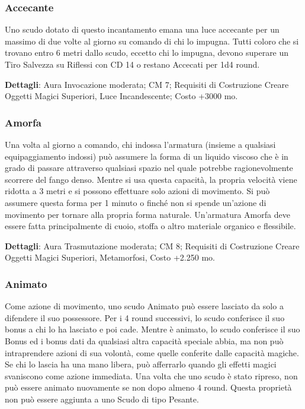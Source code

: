 \begin{multicols}{2}
\subsubsection{Accecante}

Uno scudo dotato di questo incantamento emana una luce accecante per un massimo di due volte al giorno su comando di chi lo impugna. Tutti coloro che si trovano entro 6 metri dallo scudo, eccetto chi lo impugna, devono superare un Tiro Salvezza su Riflessi con CD 14 o restano Accecati per 1d4 round.

\textbf{Dettagli}: Aura Invocazione moderata; CM 7; Requisiti di Costruzione Creare Oggetti Magici Superiori, Luce Incandescente; Costo +3000 mo.

\subsubsection{Amorfa}

Una volta al giorno a comando, chi indossa l'armatura (insieme a qualsiasi equipaggiamento indossi) può assumere la forma di un liquido viscoso che è in grado di passare attraverso qualsiasi spazio nel quale potrebbe ragionevolmente scorrere del fango denso. Mentre si usa questa capacità, la propria velocità viene ridotta a 3 metri e si possono effettuare solo azioni di movimento. Si può assumere questa forma per 1 minuto o finché non si spende un'azione di movimento per tornare alla propria forma naturale. Un'armatura Amorfa deve essere fatta principalmente di cuoio, stoffa o altro materiale organico e flessibile.

\textbf{Dettagli}: Aura Trasmutazione moderata; CM 8; Requisiti di Costruzione Creare Oggetti Magici Superiori, Metamorfosi, Costo +2.250 mo.

\subsubsection{Animato}

Come azione di movimento, uno scudo Animato può essere lasciato da solo a difendere il suo possessore. Per i 4 round successivi, lo scudo conferisce il suo bonus a chi lo ha lasciato e poi cade. Mentre è animato, lo scudo conferisce il suo Bonus ed i bonus dati da qualsiasi altra capacità speciale abbia, ma non può intraprendere azioni di sua volontà, come quelle conferite dalle capacità magiche.
Se chi lo lascia ha una mano libera, può afferrarlo quando gli effetti magici svaniscono come azione immediata. Una volta che uno scudo è stato ripreso, non può essere animato nuovamente se non dopo almeno 4 round. Questa proprietà non può essere aggiunta a uno Scudo di tipo Pesante.


\end{multicols}
